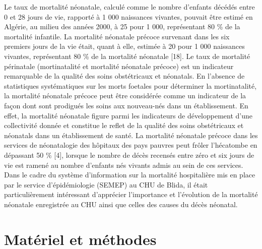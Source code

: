 \documentclass[
]{book}
\begin{document}
Le taux de mortalité néonatale, calculé comme le nombre
d'enfants décédés entre 0 et 28 jours de vie, rapporté à 1 000
naissances vivantes, pouvait être estimé en Algérie, au milieu
des années 2000, à 25 pour 1 000, représentant 80 \% de la
mortalité infantile. La mortalité néonatale précoce survenant
dans les six premiers jours de la vie était, quant à elle, estimée
à 20 pour 1 000 naissances vivantes, représentant 80 \% de la
mortalité néonatale {[}18{]}.
Le taux de mortalité périnatale (mortinatalité et mortalité
néonatale précoce) est un indicateur remarquable de la
qualité des soins obstétricaux et néonatals. En l'absence de
statistiques systématiques sur les morts foetales pour
déterminer la mortinatalité, la mortalité néonatale précoce
peut être considérée comme un indicateur de la façon dont
sont prodigués les soins aux nouveau-nés dans un établissement.
En effet, la mortalité néonatale figure parmi les
indicateurs de développement d'une collectivité donnée
et constitue le reflet de la qualité des soins obstétricaux et
néonatals dans un établissement de santé.
La mortalité néonatale précoce dans les services de
néonatalogie des hôpitaux des pays pauvres peut frôler
l'hécatombe en dépassant 50 \% {[}4{]}, lorsque le nombre de
décès recensés entre zéro et six jours de vie est ramené au
nombre d'enfants nés vivants admis au sein de ces services.
Dans le cadre du système d'information sur la mortalité
hospitalière mis en place par le service d'épidémiologie
(SEMEP) au CHU de Blida, il était particulièrement
intéressant d'apprécier l'importance et l'évolution de la
mortalité néonatale enregistrée au CHU ainsi que celles des
causes du décès néonatal.

\hypertarget{matuxe9riel-et-muxe9thodes}{%
\chapter{Matériel et méthodes}\label{matuxe9riel-et-muxe9thodes}}
\end{document}
